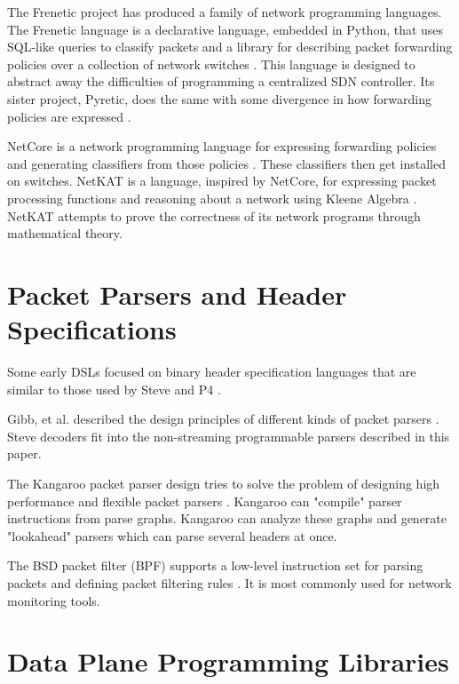 The Frenetic project has produced a family of network programming
languages. The Frenetic language is a declarative language, embedded in Python,
that uses SQL-like queries to classify packets and a library for describing
packet forwarding policies over a collection of network switches
\cite{foster2011frenetic, foster2013frenetic}. This language is designed to
abstract away the difficulties of programming a centralized SDN controller. Its
sister project, Pyretic, does the same with some divergence in how forwarding
policies are expressed \cite{modularpyretic}.

NetCore is a network programming language for expressing forwarding policies and
generating classifiers from those policies \cite{monsanto2012netcore}. These
classifiers then get installed on switches. NetKAT is a language, inspired by
NetCore, for expressing packet processing functions and reasoning about a
network using Kleene Algebra \cite{kozen2014netkat, anderson2014netkat}. NetKAT
attempts to prove the correctness of its network programs through mathematical theory.

\section{Packet Parsers and Header Specifications}

Some early DSLs focused on binary header specification languages that are similar to 
those used by Steve and P4 \cite{binpac, packet_types, datascript}.

Gibb, et al. described the design principles of different kinds of packet parsers 
\cite{parser2013gibb}. Steve decoders fit into the non-streaming programmable parsers 
described in this paper. 

The Kangaroo packet parser design tries to solve the problem of designing high performance and flexible packet parsers \cite{kangaroo}. Kangaroo can "compile" parser instructions from parse graphs. Kangaroo can analyze these graphs and generate "lookahead" parsers which can parse several headers at once.

The BSD packet filter (BPF) supports a low-level instruction set for parsing packets and defining packet filtering rules \cite{bpf1993mccanne}. It is most commonly used for network monitoring tools.

\section{Data Plane Programming Libraries}
\label{rel:odp}

